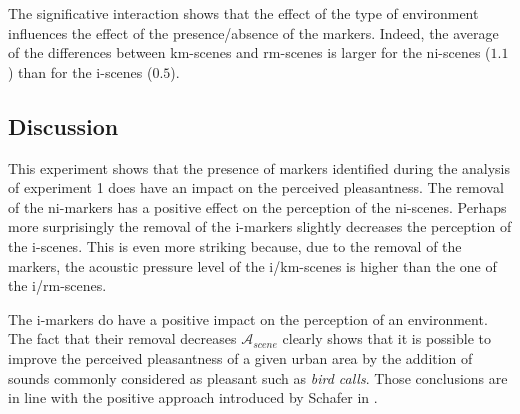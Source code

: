 \documentclass[preprint,12pt]{elsarticle}
\begin{document}
The significative interaction shows that the effect of the type of environment influences the effect of the presence/absence of the markers. Indeed, the average of the differences between km-scenes and rm-scenes is larger for the ni-scenes ($1.1$) than for the i-scenes ($0.5$).

\subsection{Discussion}


This experiment shows that the presence of markers identified during the analysis of experiment 1 does have an impact on the perceived pleasantness. The removal of the ni-markers has a positive effect on the perception of the ni-scenes. Perhaps more surprisingly the removal of the i-markers slightly decreases the perception of the i-scenes. This is even more striking because, due to the removal of the markers, the acoustic pressure level of the i/km-scenes is higher than the one of the i/rm-scenes.


The i-markers do have a positive impact on the perception of an environment. The fact that their removal decreases $\mathcal{A}_{scene}$ clearly shows that it is possible to improve the perceived pleasantness of a given urban area by the addition of sounds commonly considered as pleasant such as \emph{bird calls}. Those conclusions are in line with the positive approach introduced by Schafer in \cite{schafer1977tuning}.

\end{document}
